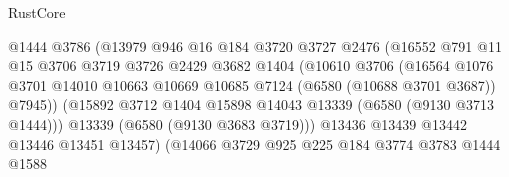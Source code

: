 \begin{lexlean}{RustCore}
\begin{coremodule}
                                    @1444
                                    @3786
                                    (@13979
                                      @946
                                      @16
                                      @184
                                      @3720
                                      @3727
                                      @2476
                                      (@16552
                                        @791
                                        @11
                                        @15
                                        @3706
                                        @3719
                                        @3726
                                        @2429
                                        @3682
                                        @1404
                                        (@10610
                                          @3706
                                          (@16564
                                            @1076
                                            @3701
                                            @14010
                                            @10663
                                            @10669
                                            @10685
                                            @7124
                                            (@6580 (@10688 @3701 @3687))
                                            @7945))
                                        (@15892
                                          @3712
                                          @1404
                                          @15898
                                          @14043
                                          @13339
                                          (@6580 (@9130 @3713 @1444)))
                                        @13339
                                        (@6580 (@9130 @3683 @3719)))
                                      @13436
                                      @13439
                                      @13442
                                      @13446
                                      @13451
                                      @13457)
                                    (@14066
                                      @3729
                                      @925
                                      @225
                                      @184
                                      @3774
                                      @3783
                                      @1444
                                      @1588

\end{coremodule}
\end{lexlean}
